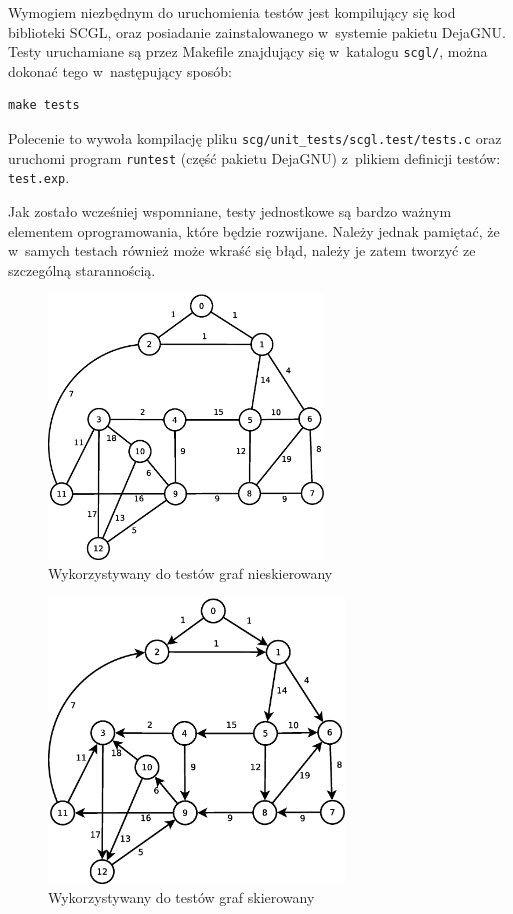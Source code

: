 \documentclass[a4paper,12pt,polish,twoside,openright]{thesis}
\newcommand\code[1]{\lstinline[style=line]{#1}}
\begin{document}
Wymogiem niezbędnym do uruchomienia testów jest kompilujący się kod biblioteki SCGL, oraz posiadanie zainstalowanego w~systemie pakietu DejaGNU.
Testy uruchamiane są przez Makefile znajdujący się w~katalogu \code{scgl/}, można dokonać tego w~następujący sposób:
\begin{lstlisting}[style=coden]
make tests
\end{lstlisting}
Polecenie to wywoła kompilację pliku \code{scg/unit_tests/scgl.test/tests.c} oraz uruchomi program \code{runtest} (część pakietu DejaGNU) z~plikiem definicji testów: \code{test.exp}.

Jak zostało wcześniej wspomniane, testy jednostkowe są bardzo ważnym elementem oprogramowania, które będzie rozwijane.
Należy jednak pamiętać, że w~samych testach również może wkraść się błąd, należy je zatem tworzyć ze szczególną starannością.

\begin{figure}[htb]
	\begin{center}
		\includegraphics[width=0.65\textwidth]{gfx/test_graph_undirected.eps}
		\caption{Wykorzystywany do testów graf nieskierowany}
		\label{fig:test_undirected}
	\end{center}
\end{figure}
\begin{figure}[htb]
	\begin{center}
		\includegraphics[width=0.7\textwidth]{gfx/test_graph_directed.eps}
		\caption{Wykorzystywany do testów graf skierowany}
		\label{fig:test_directed}
	\end{center}
\end{figure}
\end{document}
